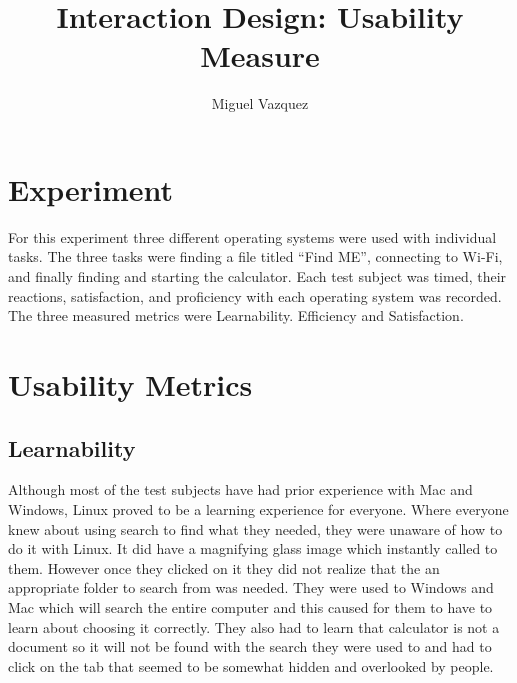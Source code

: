 \documentclass[11pt]{article}
\title{Interaction Design: Usability Measure}
\author{Miguel Vazquez}
\begin{document}
\maketitle
\tableofcontents

\section{Experiment}
For this experiment three different operating systems were used with individual tasks. The three tasks were finding a file titled “Find ME”, connecting to Wi-Fi, and finally finding and starting the calculator. Each test subject was timed, their reactions, satisfaction, and proficiency with each operating system was recorded. The three measured metrics were Learnability. Efficiency and Satisfaction.

\section{Usability Metrics}

\subsection{Learnability}
Although most of the test subjects have had prior experience with Mac and Windows, Linux proved to be a learning experience for everyone. Where everyone knew about using search to find what they needed, they were unaware of how to do it with Linux. It did have a magnifying glass image which instantly called to them. However once they clicked on it they did not realize that the an appropriate folder to search from was needed. They were used to Windows and Mac which will search the entire computer and this caused for them to have to learn about choosing it correctly. They also had to learn that calculator is not a document so it will not be found with the search they were used to and had to click on the tab that seemed to be somewhat hidden and overlooked by people.
\end{document}
